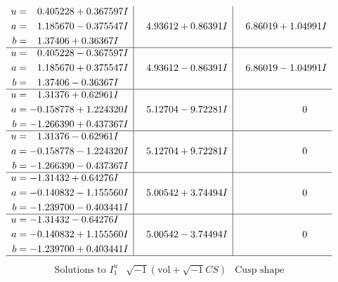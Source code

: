 \documentclass[1p]{elsarticle_modified}
\theoremstyle{definition}
\newcommand{\I}{\sqrt{-1}}
\begin{document}
$$\begin{array}{c|c|c}
\begin{aligned}
u &= \phantom{-}0.405228 + 0.367597 I \\
a &= \phantom{-}1.185670 - 0.375547 I \\
b &= \phantom{-}1.37406 + 0.36367 I\end{aligned}
 & \phantom{-}4.93612 + 0.86391 I & \phantom{-}6.86019 + 1.04991 I \\ \hline\begin{aligned}
u &= \phantom{-}0.405228 - 0.367597 I \\
a &= \phantom{-}1.185670 + 0.375547 I \\
b &= \phantom{-}1.37406 - 0.36367 I\end{aligned}
 & \phantom{-}4.93612 - 0.86391 I & \phantom{-}6.86019 - 1.04991 I \\ \hline\begin{aligned}
u &= \phantom{-}1.31376 + 0.62961 I \\
a &= -0.158778 + 1.224320 I \\
b &= -1.266390 + 0.437367 I\end{aligned}
 & \phantom{-}5.12704 - 9.72281 I & \phantom{-0.000000 } 0 \\ \hline\begin{aligned}
u &= \phantom{-}1.31376 - 0.62961 I \\
a &= -0.158778 - 1.224320 I \\
b &= -1.266390 - 0.437367 I\end{aligned}
 & \phantom{-}5.12704 + 9.72281 I & \phantom{-0.000000 } 0 \\ \hline\begin{aligned}
u &= -1.31432 + 0.64276 I \\
a &= -0.140832 - 1.155560 I \\
b &= -1.239700 - 0.403441 I\end{aligned}
 & \phantom{-}5.00542 + 3.74494 I & \phantom{-0.000000 } 0 \\ \hline\begin{aligned}
u &= -1.31432 - 0.64276 I \\
a &= -0.140832 + 1.155560 I \\
b &= -1.239700 + 0.403441 I\end{aligned}
 & \phantom{-}5.00542 - 3.74494 I & \phantom{-0.000000 } 0\\
 \hline 
 \end{array}$$\newpage$$\begin{array}{c|c|c}  
\text{Solutions to }I^u_{1}& \I (\text{vol} + \sqrt{-1}CS) & \text{Cusp shape}\\

\end{array}$$
\end{document}
